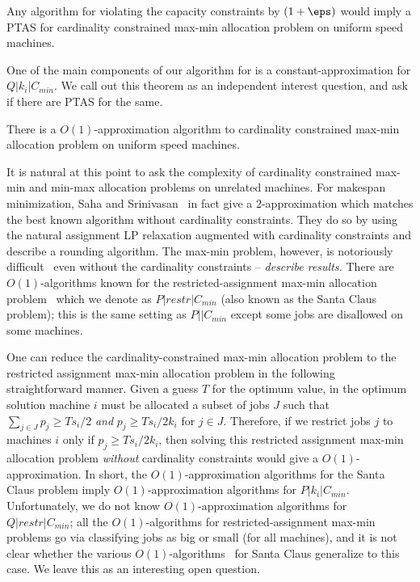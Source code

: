 \begin{theorem}
Any algorithm for \mckc violating the capacity constraints by $(1+\eps)$ would imply a PTAS for cardinality constrained max-min allocation problem on uniform speed machines.
\end{theorem}
\noindent
One of the main components of our algorithm for \mckc is a constant-approximation for $Q|k_i|C_{min}$. We call out this theorem as an independent interest question, and ask if there are PTAS for the same.
\begin{theorem}\label{thm:part2}
	There is a $O(1)$-approximation algorithm to cardinality constrained max-min allocation problem on uniform speed machines.
\end{theorem}
It is natural at this point to ask the complexity of cardinality constrained max-min and min-max allocation problems on unrelated machines. For makespan minimization, Saha and Srinivasan~\cite{SS} in fact give a $2$-approximation which matches the best known algorithm without cardinality constraints. They do so by using the natural assignment LP relaxation augmented with cardinality constraints and describe a rounding algorithm. 
The max-min problem, however, is notoriously difficult~\cite{bibid} even without the cardinality constraints -- {\em describe results.} There are $O(1)$-algorithms known for the restricted-assignment max-min allocation problem~\cite{bibid} which we denote as $P|restr|C_{min}$ (also known as the Santa Claus problem); this is the same setting as $P||C_{min}$ except some jobs are disallowed on some machines. 

One can reduce the cardinality-constrained max-min allocation problem to the restricted assignment max-min allocation problem in the following straightforward manner. Given a guess $T$ for the optimum value, in the optimum solution machine $i$ must be allocated 
a subset of jobs $J$ such that $\sum_{j\in J} p_j \ge Ts_i/2$ {\em and} $p_j \geq Ts_i/2k_i$ for $j\in J$. Therefore, if we restrict jobs $j$ to machines $i$ only if $p_j \ge Ts_i/2k_i$, then solving this restricted assignment max-min allocation problem {\em without} cardinality constraints would give a $O(1)$-approximation. In short, the $O(1)$-approximation algorithms for the Santa Claus problem imply $O(1)$-approximation algorithms for $P|k_i|C_{min}$. Unfortunately, we do not know $O(1)$-approximation algorithms for $Q|restr|C_{min}$; all the $O(1)$-algorithms for restricted-assignment max-min problems go via classifying jobs as big or small (for all machines), and it is not clear whether the various $O(1)$-algorithms~\cite{BS, Feige, Ola, AFS}  for Santa Claus generalize to this case. We leave this as an interesting open question.




